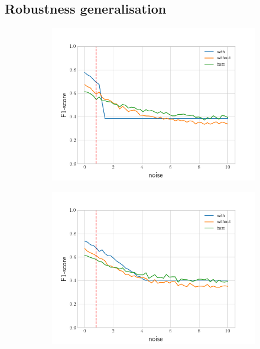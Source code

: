\subsection*{Robustness generalisation}
\begin{figure}[!h]
\centering
\begin{subfigure}{.5\textwidth}
  \centering
  \includegraphics[width=\linewidth]{figures/noise-generalisation-bad-model-0}
\end{subfigure}%
\begin{subfigure}{.5\textwidth}
  \centering
  \includegraphics[width=\linewidth]{figures/noise-generalisation-good-model-6}
\end{subfigure}
\end{figure}

